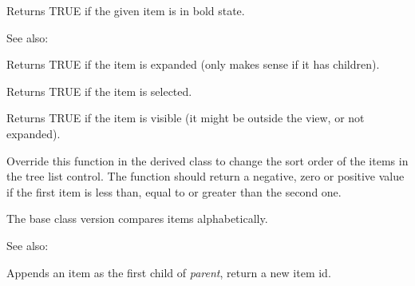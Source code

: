 \label{wxtreelistctrlisbold}


Returns TRUE if the given item is in bold state.

See also: 

\label{wxtreelistctrlisexpanded}


Returns TRUE if the item is expanded (only makes sense if it has children).

\label{wxtreelistctrlisselected}


Returns TRUE if the item is selected.

\label{wxtreelistctrlisvisible}


Returns TRUE if the item is visible (it might be outside the view, or not expanded).

\label{wxtreelistctrloncompareitems}


Override this function in the derived class to change the sort order of the
items in the tree list control. The function should return a negative, zero or
positive value if the first item is less than, equal to or greater than the
second one.

The base class version compares items alphabetically.

See also: 

\label{wxtreelistctrlprependitem}


Appends an item as the first child of {\it parent}, return a new item id.


